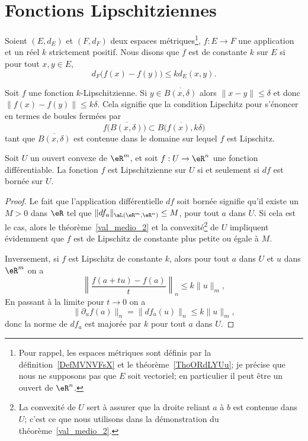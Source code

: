 \section{Fonctions Lipschitziennes}


\begin{definition}      \label{DEFooQHVEooDbYKmz}
    Soient \( (E,d_E)\) et \( (F,d_F)\) deux espaces métriques\footnote{Pour rappel, les espaces métriques sont définis par la définition~\ref{DefMVNVFsX} et le théorème~\ref{ThoORdLYUu}; je précise que nous ne supposons pas que \( E\) soit vectoriel; en particulier il peut être un ouvert de \( \eR^n\).}, \( f\colon E\to F\) une application et un réel \( k\) strictement positif. Nous disons que \( f\) est  de constante $k$ sur \( E\) si pour tout \( x,y\in E\),
    \begin{equation}
        d_F\big( f(x)-f(y) \big)\leq kd_E(x,y).
    \end{equation}
\end{definition}
Soit \( f\) une fonction \( k\)-Lipschitzienne. Si \( y\in \overline{ B(x,\delta)}\) alors \( \| x-y \|\leq\delta\) et donc \( \big\| f(x)-f(y) \big\|\leq k\delta\). Cela signifie que la condition Lipschitz pour s'énoncer en termes de boules fermées par
\begin{equation}    \label{EqDZvtUbn}
    f\big( \overline{ B(x,\delta) } \big)\subset \overline{  B\big( f(x),k\delta \big) }
\end{equation}
tant que \( \overline{ B(x,\delta) } \) est contenue dans le domaine sur lequel \( f\) est Lipschitz.

\begin{proposition}
  Soit  $U$ un ouvert convexe  de $\eR^m$, et soit $f:U\to \eR^n$ une fonction différentiable. La fonction $f$ est Lipschitzienne sur $U$ si et seulement si $df$ est bornée sur $U$.
\end{proposition}
\begin{proof}
	Le fait que l'application différentielle $df$ soit bornée signifie qu'il existe un $M>0$ dans $\eR$ tel que $\|df_a\|_{\aL(\eR^m,\eR^n)}\leq M$, pour tout $a$ dans $U$. Si cela est le cas, alors le théorème~\ref{val_medio_2} et la convexité\footnote{La convexité de $U$ sert à assurer que la droite reliant $a$ à $b$ est contenue dans $U$; c'est ce que nous utilisons dans la démonstration du théorème~\ref{val_medio_2}.} de $U$ impliquent évidemment que $f$ est de Lipschitz de constante plus petite ou égale à $M$.

	Inversement, si $f$ est Lipschitz de constante $k$, alors pour tout $a$ dans $U$ et $u$ dans $\eR^m$ on a
	\[
		\left\|\frac{f(a+tu)-f(a)}{t}\right\|_n\leq k \|u\|_m,
	\]
	En passant à la limite pour $t\to 0$ on a
	\[
		\|\partial_u f(a)\|_n=\|df_a(u)\|_n\leq k \|u\|_m,
	\]
	donc la norme de $df_a$ est majorée par $k$ pour tout $a$ dans $U$.
\end{proof}

